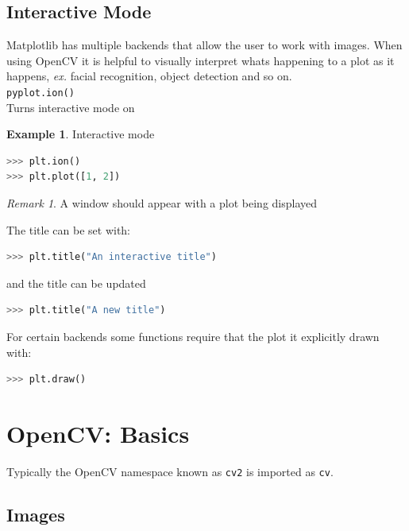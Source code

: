 \documentclass{article}
\theoremstyle{definition}
\newtheorem{ex}{Example}[subsection]
\theoremstyle{remark}
\newtheorem*{rem}{Remark}
\newcommand{\func}[2]{\noindent\lstinline{#1}\\#2}
\begin{document}
\break


\subsection{Interactive Mode}

Matplotlib has multiple backends that allow the user to work with images. When using OpenCV it is helpful to visually interpret whats happening to a plot as it happens, \textit{ex.} facial recognition, object detection and so on.\\

\func{pyplot.ion()}{Turns interactive mode on}

\begin{ex} Interactive mode
\begin{lstlisting}[language=Python]
>>> plt.ion()
>>> plt.plot([1, 2])
\end{lstlisting}
\begin{rem}
A window should appear with a plot being displayed
\end{rem}

\noindent The title can be set with:
\begin{lstlisting}[language=Python]
>>> plt.title("An interactive title")
\end{lstlisting}

\noindent and the title can be updated
\begin{lstlisting}[language=Python]
>>> plt.title("A new title")
\end{lstlisting}

\noindent For certain backends some functions require that the plot it explicitly drawn with:
\begin{lstlisting}[language=Python]
>>> plt.draw()
\end{lstlisting}
\end{ex}



\break




\section{OpenCV: Basics}

Typically the OpenCV namespace known as \lstinline{cv2} is imported as \lstinline{cv}.

\subsection{Images}
\end{document}
